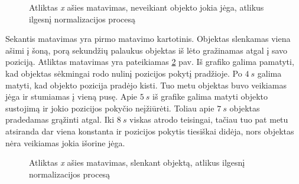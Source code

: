 \begin{figure}
    \centering
    \caption{Atliktas \textit{x} ašies matavimas, neveikiant objekto jokia jėga, atlikus ilgesnį normalizacijos procesą}
    \label{fig:x_axis_measurement_long_normalization}
\end{figure}

Sekantis matavimas yra pirmo matavimo kartotinis.
Objektas slenkamas viena ašimi į šoną, porą sekundžių palaukus objektas iš lėto gražinamas atgal į savo poziciją.
Atliktas matavimas yra pateikiamas \ref{fig:x_axis_measurement_sauna_long_normalization} pav.
Iš grafiko galima pamatyti, kad objektas sėkmingai rodo nulinį pozicijos pokytį pradžioje.
Po $4~s$ galima matyti, kad objekto pozicija pradėjo kisti.
Tuo metu objektas buvo veikiamas jėga ir stumiamas į vieną pusę.
Apie $5~s$ iš grafike galima matyti objekto sustojimą ir jokio pozicijos pokyčio neįžiūrėti.
Toliau apie $7~s$ objektas pradedamas grąžinti atgal.
Iki $8~s$ viskas atrodo teisingai, tačiau tuo pat metu atsiranda dar viena konstanta ir pozicijos pokytis tiesiškai didėja, nors objektas nėra veikiamas jokia išorine jėga.

\begin{figure}
    \centering
    \caption{Atliktas \textit{x} ašies matavimas, slenkant objektą, atlikus ilgesnį normalizacijos procesą}
    \label{fig:x_axis_measurement_sauna_long_normalization}
\end{figure}

